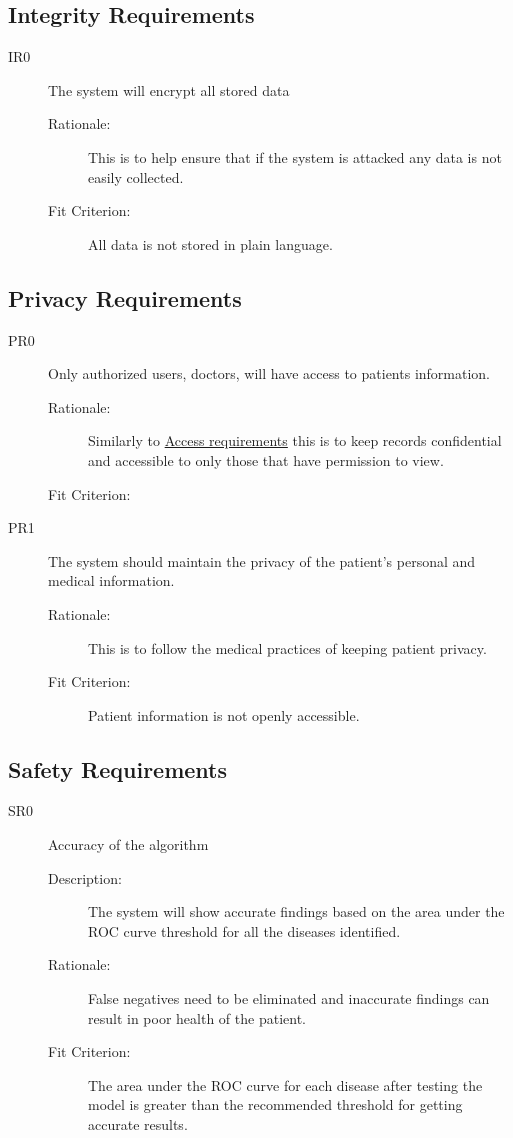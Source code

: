 \documentclass{article}
\begin{document}
\subsection{Integrity Requirements}
\begin{description}
    \item[IR0] The system will encrypt all stored data 
    \begin{description}
        \item[Rationale:] This is to help ensure that if the system is attacked any data is not easily collected. 
        \item[Fit Criterion:] All data is not stored in plain language. 
    \end{description}
\end{description}

\subsection{Privacy Requirements}
\begin{description}
    \item[PR0] Only authorized users, doctors, will have access to patients information. 
    \begin{description}
        \item[Rationale:] Similarly to \hyperlink{AR0}{Access requirements} this is to keep records confidential and accessible to only those that have permission to view.
        \item[Fit Criterion:] 
    \end{description}
    \item[PR1] The system should maintain the privacy of the patient’s personal and medical information.
    \begin{description}
        \item[Rationale:] This is to follow the medical practices of keeping patient privacy. 
        \item[Fit Criterion:] Patient information is not openly accessible. 
    \end{description}
\end{description}

\subsection{Safety Requirements}
\begin{description}
    \item[SR0] Accuracy of the algorithm
    \begin{description}
        \item[Description:] The system will show accurate findings based on the area under the ROC curve threshold for all the diseases identified.
        \item[Rationale:] False negatives need to be eliminated and inaccurate findings can result in poor health of the patient.
        \item[Fit Criterion:] The area under the ROC curve for each disease after testing the model is greater than the recommended threshold for getting accurate results.
    \end{description}
\end{description}
\end{document}
